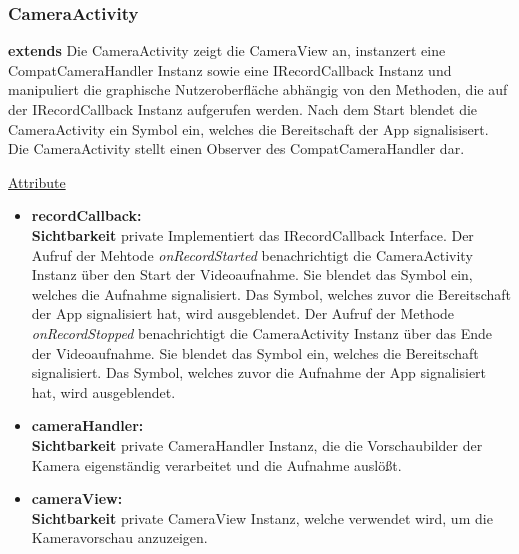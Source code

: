 \subsubsection{CameraActivity} \label{app:klasse:CameraActivity}
\textbf{extends}  \newline
Die CameraActivity zeigt die CameraView an, instanzert eine CompatCameraHandler Instanz sowie eine IRecordCallback Instanz und manipuliert die graphische Nutzeroberfläche abhängig von den Methoden, die auf der IRecordCallback Instanz aufgerufen werden. Nach dem Start blendet die CameraActivity ein Symbol ein, welches die Bereitschaft der App signalisisert. Die CameraActivity stellt einen Observer des CompatCameraHandler dar.
\newline

\underline{Attribute}
\begin{itemize}
\itemsep0pt
\item \textbf{recordCallback: } \hfill\\ 
\textbf{Sichtbarkeit} private\newline
Implementiert das IRecordCallback Interface. 
Der Aufruf der Mehtode \textit{onRecordStarted} benachrichtigt die CameraActivity Instanz über den Start der Videoaufnahme. Sie blendet das Symbol ein, welches die Aufnahme signalisiert. Das Symbol, welches zuvor die Bereitschaft der App signalisiert hat, wird ausgeblendet.
Der Aufruf der Methode \textit{onRecordStopped} benachrichtigt die CameraActivity Instanz über das Ende der Videoaufnahme. Sie blendet das Symbol ein, welches die Bereitschaft signalisiert. Das Symbol, welches zuvor die Aufnahme der App signalisiert hat, wird ausgeblendet.

\item \textbf{cameraHandler: } \hfill\\ 
\textbf{Sichtbarkeit} private\newline
CameraHandler Instanz, die die Vorschaubilder der Kamera eigenständig verarbeitet und die Aufnahme auslößt.

\item \textbf{cameraView: } \hfill\\ 
\textbf{Sichtbarkeit} private\newline
CameraView Instanz, welche verwendet wird, um die Kameravorschau anzuzeigen.

\end{itemize}

